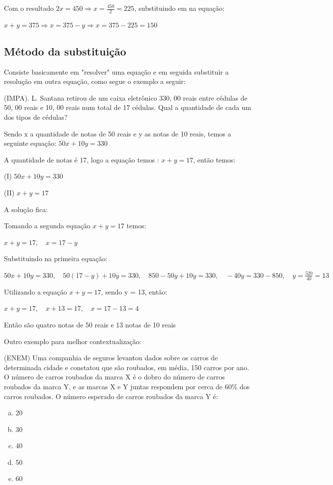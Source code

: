 \begin{multicols*}{2}
\begin{figure}[H]
\begin{tikzpicture}[x=0.75pt,y=0.75pt,yscale=-1,xscale=1]
        \end{tikzpicture}
    \end{figure}

    Com o resultado $2x = 450 \Rightarrow x = \frac{450}{2} = 225$, substituindo em na equação:

    $x+y = 375 \Rightarrow x = 375 - y \Rightarrow x = 375 - 225 = 150$

    \subsection*{Método da substituição}
    Consiste basicamente em "resolver" uma equação e em seguida substituir a resolução em outra 			equação, como segue o exemplo a seguir:

    (IMPA). L. Santana retirou de um caixa eletrônico 330, 00 reais entre cédulas de 50, 00 reais e 		10, 00 reais num total de 17 cédulas. Qual a quantidade de cada um dos tipos de cédulas?

    Sendo x a quantidade de notas de 50 reais e y as notas de 10 reais, temos a seguinte equação:
    $50x + 10y = 330$

    A quantidade de notas é 17, logo a equação temos : $x + y = 17$, então temos:

    (I) $50x + 10y = 330$

    (II) $x + y = 17$

    A solução fica:

    Tomando a segunda equação $x + y = 17$ temos:

    $x + y = 17, \quad x = 17 - y$

    Substituindo na primeira equação:

    $50x + 10y = 330, \quad 50(17 - y) + 10y = 330, \quad 850 - 50y + 10y = 330, \quad
        -40y = 330 - 850, \quad y = \frac{520}{40} = 13$

    Utilizando a equação $x + y = 17$, sendo y = 13, então:

    $x + y = 17, \quad x + 13 = 17, \quad x = 17 - 13 = 4$

    Então são quatro notas de 50 reais e 13 notas de 10 reais

    Outro exemplo para melhor contextualização:

    \noindent (ENEM) Uma companhia de seguros levantou dados sobre os carros de determinada cidade e 				constatou que são roubados, em média, 150 carros por ano. O número de carros roubados da marca 			X é o dobro do número de carros roubados da marca Y, e as marcas X e Y juntas respondem por 			cerca de 60\% dos carros roubados. O número esperado de carros roubados da marca Y é:
    \begin{enumerate}[(a)]
        \item 20
        \item 30
        \item 40
        \item 50
        \item 60
    \end{enumerate}


\end{multicols*}
